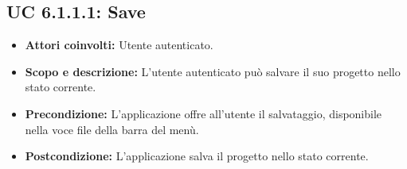 \subsection{UC 6.1.1.1: Save}
\begin{itemize}
		\item \textbf{Attori coinvolti:} Utente autenticato. \\
		\item \textbf{Scopo e descrizione:} L'utente autenticato può salvare il suo progetto nello stato corrente. \\
		\item \textbf{Precondizione:} L'applicazione offre all'utente il salvataggio, disponibile nella voce file della barra del menù. \\
		\item \textbf{Postcondizione:} L'applicazione salva il progetto nello stato corrente. \\
\end{itemize}